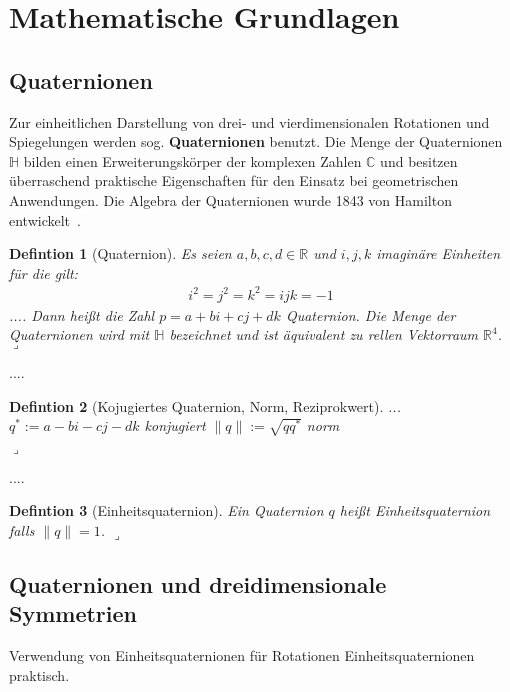 \newtheorem{defdef}{Defintion}[section]
\newenvironment{definition}[1][]{\begin{defdef}[#1] \normalfont\hspace*{1mm}}{\hfill $\lrcorner$\end{defdef}\vspace{0.2cm}}

\section{Mathematische Grundlagen}
\subsection{Quaternionen}\label{quaternionen}
Zur einheitlichen Darstellung von drei- und vierdimensionalen Rotationen und Spiegelungen werden
sog. \textbf{Quaternionen} benutzt.
Die Menge der Quaternionen $\mathbb{H}$ bilden einen Erweiterungskörper der komplexen Zahlen $\mathbb{C}$ und besitzen überraschend praktische Eigenschaften für den Einsatz bei geometrischen Anwendungen. Die Algebra der Quaternionen wurde 1843 von Hamilton entwickelt~\cite{hazewinkel2004algebras}.

\begin{definition}[Quaternion]
Es seien $a,b,c,d \in \mathbb{R}$ und $i,j,k$ imaginäre Einheiten für die gilt:
\begin{equation*}\begin{split}
i^2 = j^2 = k^2 = ijk = -1
\end{split}\end{equation*}
....
Dann heißt die Zahl $p = a + bi + cj + dk$ Quaternion. Die Menge der Quaternionen wird mit $\mathbb{H}$ bezeichnet
und ist äquivalent zu rellen Vektorraum $\mathbb{R}^4$.
\end{definition}
....
\begin{definition}[Kojugiertes Quaternion, Norm, Reziprokwert]
...
$q^* := a - bi - cj - dk$ konjugiert
$\| q \| := \sqrt{q q^*}$ norm

\end{definition}

....

\begin{definition}[Einheitsquaternion]
Ein Quaternion $q$ heißt Einheitsquaternion falls $\|q\| = 1$.
\end{definition}

\subsection{Quaternionen und dreidimensionale Symmetrien}
Verwendung von Einheitsquaternionen für Rotationen 
Einheitsquaternionen praktisch.

